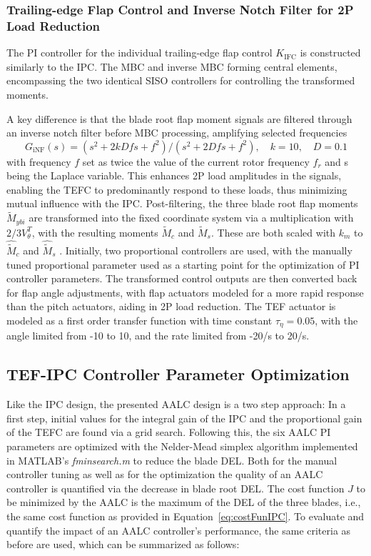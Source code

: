\subsubsection*{Trailing-edge Flap Control and Inverse Notch Filter for 2P Load Reduction}
The PI controller for the individual trailing-edge flap control $K_{\text{IFC}}$ is constructed similarly to the IPC. The MBC and inverse MBC forming central elements, encompassing the two identical SISO controllers for controlling the transformed moments.

A key difference is that the blade root flap moment signals are filtered through an inverse notch filter before MBC processing, amplifying selected frequencies
\begin{equation*} \label{eq:Ginf}
    G_{\text{iNF}}(s) = (s^2 +2kDfs +f^2)/ (s^2 +2Dfs +f^2),\quad k=10,\quad D = 0.1
\end{equation*}
with frequency $f$ set as twice the value of the current rotor frequency $f_r$ and s being the Laplace variable. This enhances 2P load amplitudes in the signals, enabling the TEFC to predominantly respond to these loads, thus minimizing mutual influence with the IPC. Post-filtering, the three blade root flap moments $\tilde{M}_{ybi}$ are transformed into the fixed coordinate system via a multiplication with $2/3 V^T_{\theta}$, with the resulting moments $\tilde{M}_{c}$ and $\tilde{M}_{s}$. These are both scaled with $k_m$ to $\hat{\tilde{M}}_c$ and $\hat{\tilde{M}}_s$ . Initially, two proportional controllers are used, with the manually tuned proportional parameter used as a starting point for the optimization of PI controller parameters. The transformed control outputs are then converted back for flap angle adjustments, with flap actuators modeled for a more rapid response than the pitch actuators, aiding in 2P load reduction. The TEF actuator is modeled as a first order transfer function with time constant $\tau_{\eta}=0.05$, with the angle limited from -10\textdegree{} to 10\textdegree{}, and the rate limited from -20\textdegree{}/s to 20\textdegree{}/s.

\subsection*{TEF-IPC Controller Parameter Optimization} \label{sec:ControllerParameterOptimization}
Like the IPC design, the presented AALC design is a two step approach: In a first step, initial values for the integral gain of the IPC and the proportional gain of the TEFC are found via a grid search. Following this, the six AALC PI parameters are optimized with the Nelder-Mead simplex algorithm implemented in MATLAB’s \textit{fminsearch.m} to reduce the blade DEL. Both for the manual controller tuning as well as for the optimization the quality of an AALC controller is quantified via the decrease in blade root DEL. The cost function $J$ to be minimized by the AALC is the maximum of the DEL of the three blades, i.e., the same cost function as provided in Equation~\eqref{eq:costFunIPC}.
To evaluate and quantify the impact of an AALC controller's performance, the same criteria as before are used, which can be summarized as follows:

